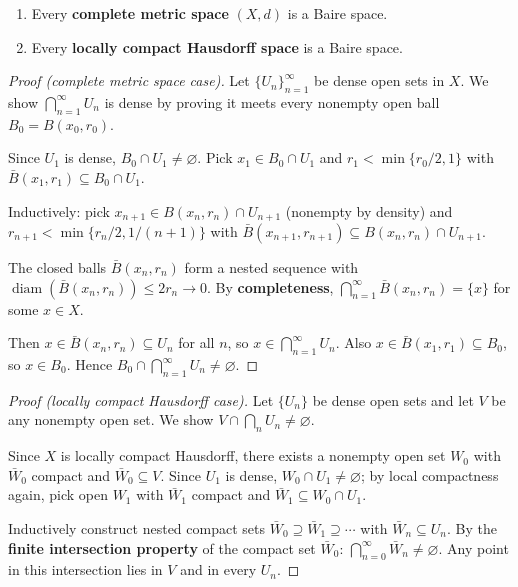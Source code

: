 \documentclass{article}
\begin{document}
\begin{theorem}
  \begin{enumerate}
    \item Every \textbf{complete metric space} $(X, d)$ is a Baire space.
    \item Every \textbf{locally compact Hausdorff space} is a Baire space.
  \end{enumerate}
\end{theorem}

\begin{proof}[Proof (complete metric space case)]
  Let $\{U_n\}_{n=1}^\infty$ be dense open sets in $X$. We show
  $\bigcap_{n=1}^\infty U_n$ is dense by proving it meets every nonempty
  open ball $B_0 = B(x_0, r_0)$.

  Since $U_1$ is dense, $B_0 \cap U_1 \ne \varnothing$.
  Pick $x_1 \in B_0 \cap U_1$ and $r_1 < \min\{r_0/2, 1\}$ with
  $\bar{B}(x_1, r_1) \subseteq B_0 \cap U_1$.

  Inductively: pick $x_{n+1} \in B(x_n, r_n) \cap U_{n+1}$ (nonempty by density)
  and $r_{n+1} < \min\{r_n/2, 1/(n+1)\}$ with
  $\bar{B}(x_{n+1}, r_{n+1}) \subseteq B(x_n, r_n) \cap U_{n+1}$.

  The closed balls $\bar{B}(x_n, r_n)$ form a nested sequence with
  $\operatorname{diam}(\bar{B}(x_n, r_n)) \le 2r_n \to 0$.
  By \textbf{completeness}, $\bigcap_{n=1}^\infty \bar{B}(x_n, r_n) = \{x\}$
  for some $x \in X$.

  Then $x \in \bar{B}(x_n, r_n) \subseteq U_n$ for all $n$, so
  $x \in \bigcap_{n=1}^\infty U_n$.
  Also $x \in \bar{B}(x_1, r_1) \subseteq B_0$, so $x \in B_0$.
  Hence $B_0 \cap \bigcap_{n=1}^\infty U_n \ne \varnothing$.
\end{proof}

\begin{proof}[Proof (locally compact Hausdorff case)]
  Let $\{U_n\}$ be dense open sets and let $V$ be any nonempty open set.
  We show $V \cap \bigcap_n U_n \ne \varnothing$.

  Since $X$ is locally compact Hausdorff, there exists a nonempty open set
  $W_0$ with $\bar{W}_0$ compact and $\bar{W}_0 \subseteq V$.
  Since $U_1$ is dense, $W_0 \cap U_1 \ne \varnothing$; by local compactness
  again, pick open $W_1$ with $\bar{W}_1$ compact and
  $\bar{W}_1 \subseteq W_0 \cap U_1$.

  Inductively construct nested compact sets
  $\bar{W}_0 \supseteq \bar{W}_1 \supseteq \cdots$ with
  $\bar{W}_n \subseteq U_n$.
  By the \textbf{finite intersection property} of the compact set
  $\bar{W}_0$:
  $\bigcap_{n=0}^\infty \bar{W}_n \ne \varnothing$.
  Any point in this intersection lies in $V$ and in every $U_n$.
\end{proof}
\end{document}
